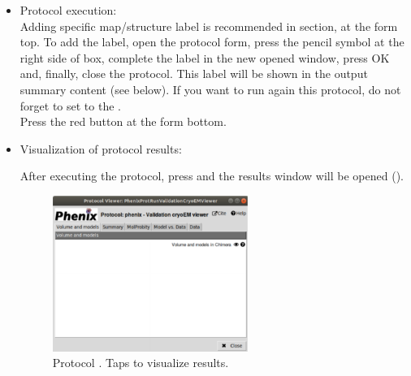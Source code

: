 \begin{itemize}
 \item Protocol execution:\\
 Adding specific map/structure label is recommended in  section, at the form top. To add the label, open the protocol form, press the pencil symbol at the right side of  box, complete the label in the new opened window, press OK and, finally, close the protocol. This label will be shown in the output summary content (see below). If you want to run again this protocol, do not forget to set to  the .\\
  Press the  red button at the form bottom.
  
 \item Visualization of protocol results:
 
 After executing the protocol, press  and the results window will be opened (). 
  
    \begin{figure}[H]
     \centering 
     \captionsetup{width=.7\linewidth} 
     \includegraphics[width=0.60\textwidth]{Images_appendix/Fig200.pdf}
     \caption{Protocol . Taps to visualize  results.}
     \label{fig:validationCryoEM_protocol_2}
    \end{figure}
    

\end{itemize}
